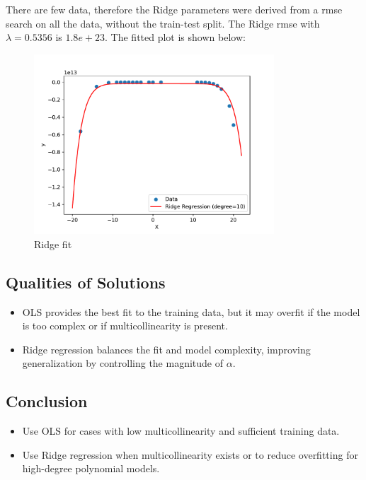 There are few data, therefore the Ridge parameters were derived from a rmse search on all the data, without the train-test split.
The Ridge rmse with $\lambda = 0.5356$ is $1.8e+23$.
The fitted plot is shown below:
\begin{figure}
    \centering
    \includegraphics[width=0.8\textwidth]{code/figures/ridge_plot.pdf}
    \caption{Ridge fit}
\end{figure}



\subsection*{Qualities of Solutions}
\begin{itemize}
    \item OLS provides the best fit to the training data, but it may overfit if the model is too complex or if multicollinearity is present.
    \item Ridge regression balances the fit and model complexity, improving generalization by controlling the magnitude of $\alpha$.
\end{itemize}

\subsection*{Conclusion}
\begin{itemize}
    \item Use OLS for cases with low multicollinearity and sufficient training data.
    \item Use Ridge regression when multicollinearity exists or to reduce overfitting for high-degree polynomial models.
\end{itemize}

